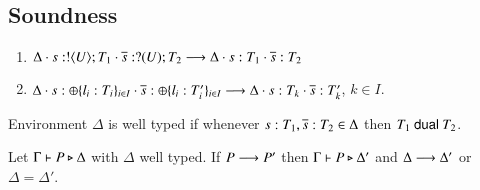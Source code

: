 \subsection{Soundness}

\begin{definition}
	\begin{enumerate}
		\item	$\Delta \cdot s: ! \langle U \rangle ; T_1 \cdot \overline{s}: ? (U) ; T_2 \longrightarrow \Delta \cdot s: T_1 \cdot \overline{s}: T_2$
		\item	$\Delta \cdot s: \oplus \{l_i: T_i\}_{i \in I} \cdot \overline{s}: \oplus \{l_i: T'_i\}_{i \in I} \longrightarrow \Delta \cdot s: T_k \cdot \overline{s}: T'_k$, $k \in I$.
	\end{enumerate}
\end{definition}

\begin{definition}
	Environment $\Delta$ is well typed if whenever $s: T_1, \overline{s} : T_2 \in \Delta$
	then $T_1 \ \mathsf{dual}\  T_2$.
\end{definition}

\begin{lemma}[Substitution]
\end{lemma}

\begin{theorem}
	Let $\Gamma \vdash P \triangleright \Delta$ with $\Delta$ well typed.
	If $P \longrightarrow P'$ then $\Gamma \vdash P \triangleright \Delta'$ and $\Delta \longrightarrow \Delta'$ or $\Delta = \Delta'$.
\end{theorem}
